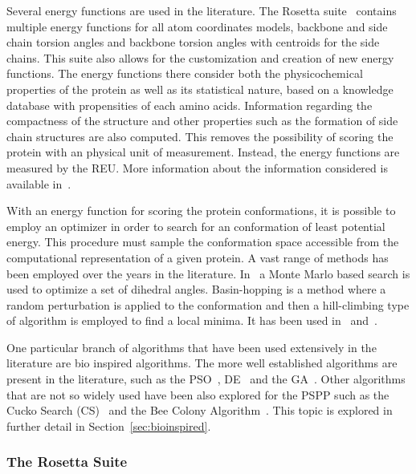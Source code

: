 Several energy functions are used in the literature. The Rosetta
suite~\cite{rohl2004protein,kaufmann2010practically} contains multiple energy
functions for all atom coordinates models, backbone and side chain torsion
angles and backbone torsion angles with centroids for the side chains. This
suite also allows for the customization and creation of new energy functions.
The energy functions there consider both the physicochemical properties of the
protein as well as its statistical nature, based on a knowledge database with
propensities of each amino acids. Information regarding the compactness of the
structure and other properties such as the formation of side chain structures
are also computed. This removes the possibility of scoring the protein with an
physical unit of measurement. Instead, the energy functions are measured by the
\ac{REU}. More information about the information considered is available
in~\cite{alford2017rosetta}.

With an energy function for scoring the protein conformations, it is possible
to employ an optimizer in order to search for an conformation of least
potential energy. This procedure must sample the conformation space accessible
from the computational representation of a given protein. A vast range of
methods has been employed over the years in the literature.
In~\cite{li1987monte} a Monte Marlo based search is used to optimize a set of
dihedral angles. Basin-hopping is a method where a random perturbation is
applied to the conformation and then a hill-climbing type of algorithm is
employed to find a local minima. It has been used in~\cite{prentiss2008protein}
and~\cite{olson2012efficient}.

One particular branch of algorithms that have been used extensively in the
literature are bio inspired algorithms. The more well established algorithms
are present in the literature, such as the \ac{PSO}~\cite{geng2017protein},
\ac{DE}~\cite{hao2017conformational} and the \ac{GA}~\cite{higgs2010genetic}.
Other algorithms that are not so widely used have been also explored for the
\ac{PSPP} such as the Cucko Search (CS)~\cite{ramyachitra2017modcsa} and the
Bee Colony Algorithm~\cite{li2015balance}. This topic is explored in further
detail in Section~\ref{sec:bioinspired}.

\subsubsection{The Rosetta Suite} \label{sec:rosetta}

